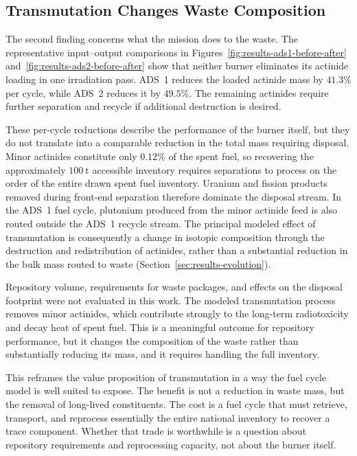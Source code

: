 \subsection{Transmutation Changes Waste Composition}
\label{subsec:discussion-character}

The second finding concerns what the mission does to the waste. The
representative input--output comparisons in
Figures~\ref{fig:results-ads1-before-after}
and~\ref{fig:results-ads2-before-after} show that neither burner eliminates
its actinide loading in one irradiation pass. ADS~1 reduces the loaded
actinide mass by \(41.3\%\) per cycle, while ADS~2 reduces it by
\(49.5\%\). The remaining actinides require further separation and recycle
if additional destruction is desired.

These per-cycle reductions describe the performance of the burner itself,
but they do not translate into a comparable reduction in the total mass
requiring disposal. Minor actinides constitute only \(0.12\%\) of the spent
fuel, so recovering the approximately \(100~\mathrm{t}\) accessible inventory
requires separations to process on the order of the entire drawn spent fuel
inventory. Uranium and fission products removed during front-end separation
therefore dominate the disposal stream. In the ADS~1 fuel cycle, plutonium
produced from the minor actinide feed is also routed outside the ADS~1 recycle
stream. The principal modeled effect of transmutation is consequently a change
in isotopic composition through the destruction and redistribution of
actinides, rather than a substantial reduction in the bulk mass routed to
waste (Section~\ref{sec:results-evolution}).

Repository volume, requirements for waste packages, and effects on the disposal
footprint were not evaluated in this work. The modeled transmutation process
removes minor actinides, which contribute strongly to the long-term radiotoxicity
and decay heat of spent fuel. This is a meaningful outcome for repository
performance, but it changes the composition of the waste rather than substantially
reducing its mass, and it requires handling the full inventory.

This reframes the value proposition of transmutation in a way the fuel cycle
model is well suited to expose. The benefit is not a reduction in waste mass, but the removal of long-lived
constituents. The cost is a fuel cycle that must retrieve,
transport, and reprocess essentially the entire national inventory to recover a
trace component. Whether that trade is worthwhile is a question about repository
requirements and reprocessing capacity, not about the burner itself.

